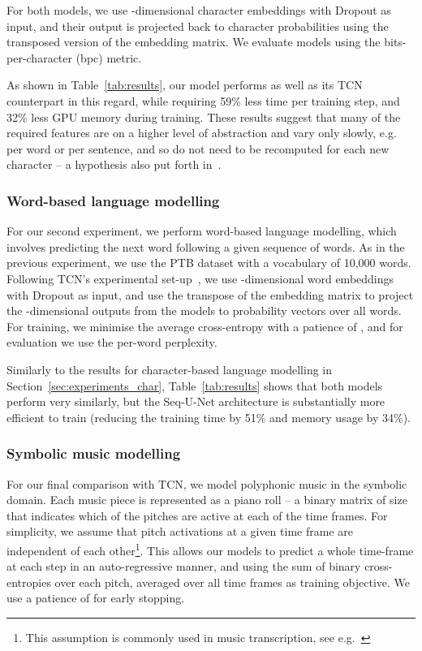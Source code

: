 \documentclass{article}
\begin{document}
For both models, we use -dimensional character embeddings with  Dropout as input, and their output is projected back to character probabilities using the transposed version of the embedding matrix.
We evaluate models using the bits-per-character (bpc) metric.

As shown in Table~\ref{tab:results}, our model performs as well as its TCN counterpart in this regard, while requiring 59\% less time per training step, and 32\% less GPU memory during training.
These results suggest that many of the required features are on a higher level of abstraction and vary only slowly, e.g. per word or per sentence, and so do not need to be recomputed for each new character -- a hypothesis also put forth in~\cite{chungHierarchicalMultiscale2016}.

\subsubsection{Word-based language modelling}
\label{sec:experiments_word}

For our second experiment, we perform word-based language modelling, which involves predicting the next word following a given sequence of words.
As in the previous experiment, we use the PTB dataset with a vocabulary of 10,000 words.
Following TCN's experimental set-up~\cite{bai2018convolutional}, we use -dimensional word embeddings with  Dropout as input, and use the transpose of the embedding matrix to project the -dimensional outputs from the models to probability vectors over all words. 
For training, we minimise the average cross-entropy with a patience of , and for evaluation we use the per-word perplexity.

Similarly to the results for character-based language modelling in Section~\ref{sec:experiments_char}, Table~\ref{tab:results} shows that both models perform very similarly, but the Seq-U-Net architecture is substantially more efficient to train (reducing the training time by 51\% and memory usage by 34\%).

\subsubsection{Symbolic music modelling}
\label{sec:experiments_music}

For our final comparison with TCN, we model polyphonic music in the symbolic domain.
Each music piece is represented as a piano roll -- a binary matrix of size  that indicates which of the  pitches are active at each of the  time frames.
For simplicity, we assume that pitch activations at a given time frame are independent of each other\footnote{This assumption is commonly used in music transcription, see e.g.~\cite{ycartPolyphonicMusic2018}}.
This allows our models to predict a whole time-frame at each step in an auto-regressive manner, and using the sum of binary cross-entropies over each pitch, averaged over all time frames as training objective.
We use a patience of  for early stopping.
\end{document}
